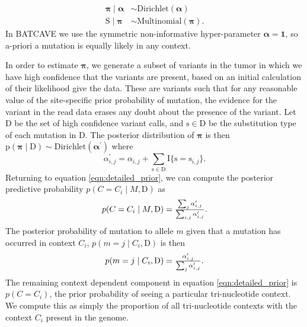 \documentclass[a4,center,fleqn]{NAR}
\newcommand{\batcave}{BATCAVE }
\begin{document}
$$
\begin{aligned}
  \boldsymbol{\pi} \mid \boldsymbol{\alpha} &\sim \textrm{Dirichlet}(\boldsymbol{\alpha}) \\
  \mathrm{S} \mid \boldsymbol{\pi} & \sim \textrm{Multinomial}(\boldsymbol{\pi}).
\end{aligned}
$$
In \batcave we use the symmetric non-informative hyper-parameter $\boldsymbol{\alpha} = \boldsymbol{1}$, so a-priori a mutation is equally likely in any context.

In order to estimate $\boldsymbol{\pi}$, we generate a subset of variants in the tumor in which we have high confidence that the variants are present, based on an initial calculation of their likelihood give the data.
These are variants such that for any reasonable value of the site-specific prior probability of mutation, the evidence for the variant in the read data erases any doubt about the presence of the variant. 
Let $\mathrm{D}$ be the set of high confidence variant calls, and $\mathrm{s} \in \mathrm{D}$ be the substitution type of each mutation in $\mathrm{D}$.
The posterior distribution of $\boldsymbol{\pi}$ is then $\mathrm{p}(\boldsymbol{\pi} \mid \mathrm{D}) \sim \textrm{Dirichlet}(\boldsymbol{\alpha^{\prime}})$ where
  $$
    \alpha^{\prime}_{i,j} = \alpha_{i,j} + \sum\limits_{\mathrm{s} \in \mathrm{D}} \mathrm{I}\{\mathrm{s} = \mathrm{s}_{i,j}\}.
  $$
Returning to equation \ref{eqn:detailed_prior}, we can compute the posterior predictive probability $p(C = C_{i} \mid M,\mathrm{D})$ as
\begin{equation}
  \label{eqn:post_pred}
  $$
  p(C = C_{i} \mid M,\mathrm{D}) = \frac{\sum_{j}\alpha^{\prime}_{i,j}}{\sum_{i,j}\alpha^{\prime}_{i,j}}.
  $$
\end{equation}
The posterior probability of mutation to allele $m$ given that a mutation has occurred in context $C_{i}$, $p(m = j \mid C_{i},\mathrm{D})$ is then
\begin{equation}
  \label{eqn:to_allele}
  $$
   p(m = j \mid C_{i},\mathrm{D}) = \frac{\alpha^{\prime}_{i,j}}{\sum_{j} \alpha^{\prime}_{i,j}}.
  $$
\end{equation}
The remaining context dependent component in equation \ref{eqn:detailed_prior} is $p(C = C_{i})$, the prior probability of seeing a particular tri-nucleotide context.
We compute this as simply the proportion of all tri-nucleotide contexts with the context $C_{i}$ present in the genome.
\end{document}
